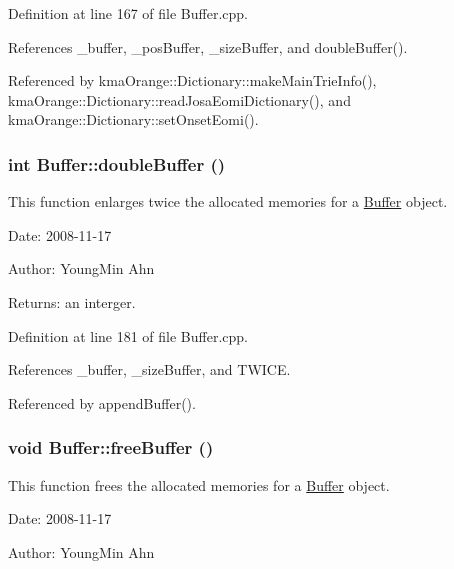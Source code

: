 Definition at line 167 of file Buffer.cpp.

References \_\-buffer, \_\-posBuffer, \_\-sizeBuffer, and doubleBuffer().

Referenced by kmaOrange::Dictionary::makeMainTrieInfo(), kmaOrange::Dictionary::readJosaEomiDictionary(), and kmaOrange::Dictionary::setOnsetEomi().\hypertarget{classkmaOrange_1_1Buffer_4d13cf9b192211134c9a2e92d4eec326}{
\subsubsection[{doubleBuffer}]{\setlength{\rightskip}{0pt plus 5cm}int Buffer::doubleBuffer ()}}
\label{classkmaOrange_1_1Buffer_4d13cf9b192211134c9a2e92d4eec326}


This function enlarges twice the allocated memories for a \hyperlink{classkmaOrange_1_1Buffer}{Buffer} object. 

\begin{Desc}
\item[Date:]2008-11-17 \end{Desc}
\begin{Desc}
\item[Author:]YoungMin Ahn \end{Desc}
\begin{Desc}
\item[Returns:]an interger. \end{Desc}


Definition at line 181 of file Buffer.cpp.

References \_\-buffer, \_\-sizeBuffer, and TWICE.

Referenced by appendBuffer().\hypertarget{classkmaOrange_1_1Buffer_731c624eb9b6e4536226925a4c1ab067}{
\subsubsection[{freeBuffer}]{\setlength{\rightskip}{0pt plus 5cm}void Buffer::freeBuffer ()}}
\label{classkmaOrange_1_1Buffer_731c624eb9b6e4536226925a4c1ab067}


This function frees the allocated memories for a \hyperlink{classkmaOrange_1_1Buffer}{Buffer} object. 

\begin{Desc}
\item[Date:]2008-11-17 \end{Desc}
\begin{Desc}
\item[Author:]YoungMin Ahn \end{Desc}


